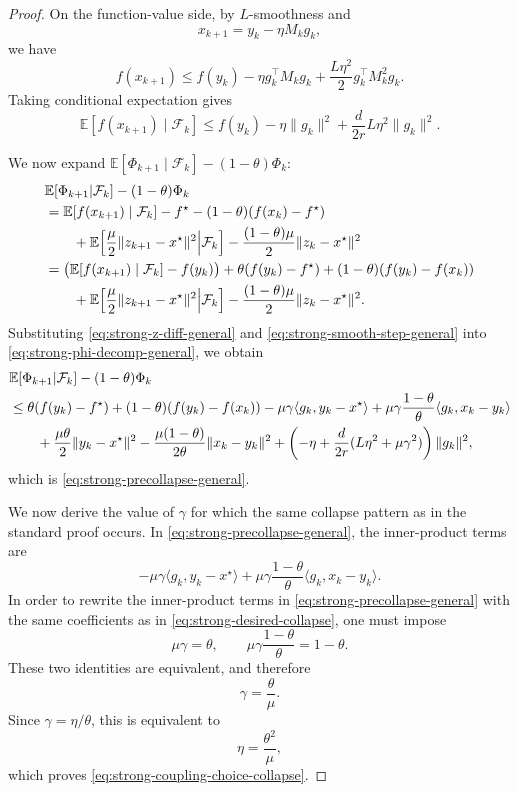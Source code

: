 \documentclass[10pt]{article}
\begin{document}
\begin{proof}
On the function-value side, by \(L\)-smoothness and
\[
x_{k+1}=y_k-\eta M_k g_k,
\]
we have
\[
f(x_{k+1})
\le
f(y_k)-\eta g_k^\top M_k g_k+\frac{L\eta^2}{2}g_k^\top M_k^2 g_k.
\]
Taking conditional expectation gives
\begin{equation}
\mathbb E[f(x_{k+1})\mid \mathcal F_k]
\le
f(y_k)-\eta\|g_k\|^2+\frac{d}{2r}L\eta^2\|g_k\|^2.
\label{eq:strong-smooth-step-general}
\end{equation}

We now expand \(\mathbb E[\Phi_{k+1}\mid\mathcal F_k]-(1-\theta)\Phi_k\):
\begin{align}
&\mathbb E\!\left[\Phi_{k+1}\middle|\mathcal F_k\right]-(1-\theta)\Phi_k
\notag\\
&=
\mathbb E[f(x_{k+1})\mid\mathcal F_k]-f^\star-(1-\theta)(f(x_k)-f^\star)
\notag\\
&\qquad
+\mathbb E\!\left[
\frac{\mu}{2}\|z_{k+1}-x^\star\|^2
\middle|\mathcal F_k
\right]
-\frac{(1-\theta)\mu}{2}\|z_k-x^\star\|^2
\notag\\
&=
\bigl(\mathbb E[f(x_{k+1})\mid\mathcal F_k]-f(y_k)\bigr)
+\theta(f(y_k)-f^\star)
+(1-\theta)(f(y_k)-f(x_k))
\notag\\
&\qquad
+\mathbb E\!\left[
\frac{\mu}{2}\|z_{k+1}-x^\star\|^2
\middle|\mathcal F_k
\right]
-\frac{(1-\theta)\mu}{2}\|z_k-x^\star\|^2.
\label{eq:strong-phi-decomp-general}
\end{align}
Substituting \eqref{eq:strong-z-diff-general} and \eqref{eq:strong-smooth-step-general} into
\eqref{eq:strong-phi-decomp-general}, we obtain
\begin{align}
&\mathbb E\!\left[\Phi_{k+1}\middle|\mathcal F_k\right]-(1-\theta)\Phi_k
\notag\\
&\le
\theta(f(y_k)-f^\star)
+(1-\theta)(f(y_k)-f(x_k))
-\mu\gamma\langle g_k,y_k-x^\star\rangle
+\mu\gamma\frac{1-\theta}{\theta}\langle g_k,x_k-y_k\rangle
\notag\\
&\qquad
+\frac{\mu\theta}{2}\|y_k-x^\star\|^2
-\frac{\mu(1-\theta)}{2\theta}\|x_k-y_k\|^2
+\left(
-\eta+\frac{d}{2r}(L\eta^2+\mu\gamma^2)
\right)\|g_k\|^2,
\end{align}
which is \eqref{eq:strong-precollapse-general}.

We now derive the value of \(\gamma\) for which the same collapse pattern as in the
standard proof occurs. In \eqref{eq:strong-precollapse-general}, the inner-product terms are
\[
-\mu\gamma\langle g_k,y_k-x^\star\rangle
+\mu\gamma\frac{1-\theta}{\theta}\langle g_k,x_k-y_k\rangle.
\]
In order to rewrite the inner-product terms in \eqref{eq:strong-precollapse-general}
with the same coefficients as in \eqref{eq:strong-desired-collapse}, one must impose
\[
\mu\gamma=\theta,
\qquad
\mu\gamma\frac{1-\theta}{\theta}=1-\theta.
\]
These two identities are equivalent, and therefore
\[
\gamma=\frac{\theta}{\mu}.
\]
Since \(\gamma=\eta/\theta\), this is equivalent to
\[
\eta=\frac{\theta^2}{\mu},
\]
which proves \eqref{eq:strong-coupling-choice-collapse}.


\end{proof}
\end{document}
